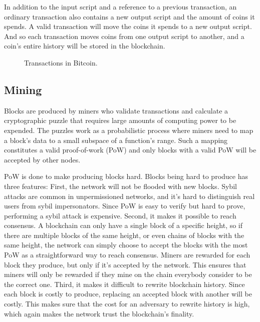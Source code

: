 In addition to the input script and a reference to a previous transaction, an ordinary transaction also contains a new output script and the amount of coins it spends. A valid transaction will move the coins it spends to a new output script. And so each transaction moves coins from one output script to another, and a coin's entire history will be stored in the blockchain. 

\begin{figure}[htbp]
  \centering
  
  \caption{Transactions in Bitcoin.}
  \label{fig:bitcoin-transactions}
\end{figure}

\subsection{Mining}

Blocks are produced by miners who validate transactions and calculate a cryptographic puzzle that requires large amounts of computing power to be expended. The puzzles work as a probabilistic process where miners need to map a block's data to a small subspace of a function's range. Such a mapping constitutes a valid proof-of-work (PoW) and only blocks with a valid PoW will be accepted by other nodes. 

PoW is done to make producing blocks hard. Blocks being hard to produce has three features: First, the network will not be flooded with new blocks. Sybil attacks are common in unpermissioned networks, and it's hard to distinguish real users from sybil impersonators. Since PoW is easy to verify but hard to prove, performing a sybil attack is expensive. Second, it makes it possible to reach consensus. A blockchain can only have a single block of a specific height, so if there are multiple blocks of the same height, or even chains of blocks with the same height, the network can simply choose to accept the blocks with the most PoW as a straightforward way to reach consensus. Miners are rewarded for each block they produce, but only if it's accepted by the network. This ensures that miners will only be rewarded if they mine on the chain everybody consider to be the correct one. Third, it makes it difficult to rewrite blockchain history. Since each block is costly to produce, replacing an accepted block with another will be costly. This makes sure that the cost for an adversary to rewrite history is high, which again makes the network trust the blockchain's finality.

